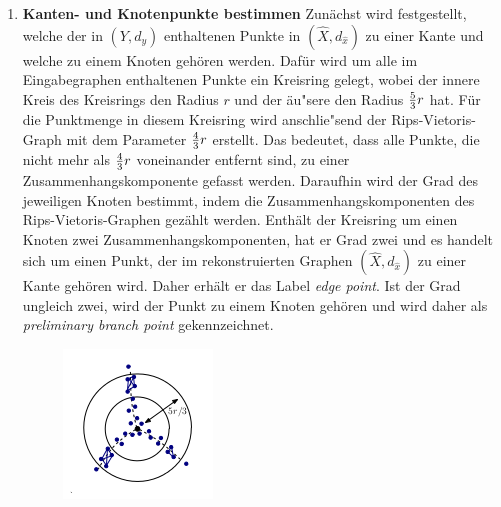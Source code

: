 \documentclass[parskip=half,
 fontsize=12pt, bibtotoc,
 titlepage, ngerman]
 {article}
\begin{document}
\begin{enumerate}
\item \textbf{Kanten- und Knotenpunkte bestimmen}\newline
Zunächst wird festgestellt, welche der in $\left(Y, d_y\right)$ enthaltenen Punkte in $(\hat{X}, d_{\hat{x}})$ zu einer Kante und welche zu einem Knoten gehören werden. Dafür wird um alle im Eingabegraphen enthaltenen Punkte ein Kreisring gelegt, wobei der innere Kreis des Kreisrings den Radius $r$ und der äu"sere den Radius ${5\over 3}r$ hat. Für die Punktmenge in diesem Kreisring wird anschlie"send der Rips-Vietoris-Graph mit dem Parameter ${4 \over 3}r$ erstellt. Das bedeutet, dass alle Punkte, die nicht mehr als ${4 \over 3}r$ voneinander entfernt sind, zu einer Zusammenhangskomponente gefasst werden. Daraufhin wird der Grad des jeweiligen Knoten bestimmt, indem die Zusammenhangskomponenten des Rips-Vietoris-Graphen gezählt werden. Enthält der Kreisring um einen Knoten zwei Zusammenhangskomponenten, hat er Grad zwei und es handelt sich um einen Punkt, der im rekonstruierten Graphen $(\hat{X}, d_{\hat{x}})$ zu einer Kante gehören wird. Daher erhält er das Label \textit{edge point}. Ist der Grad ungleich zwei, wird der Punkt zu einem Knoten gehören und wird daher als \textit{preliminary branch point} gekennzeichnet.

\begin{figure}[h]
\centering
\includegraphics{branch.png}
\end{figure}


\end{enumerate}
\end{document}
